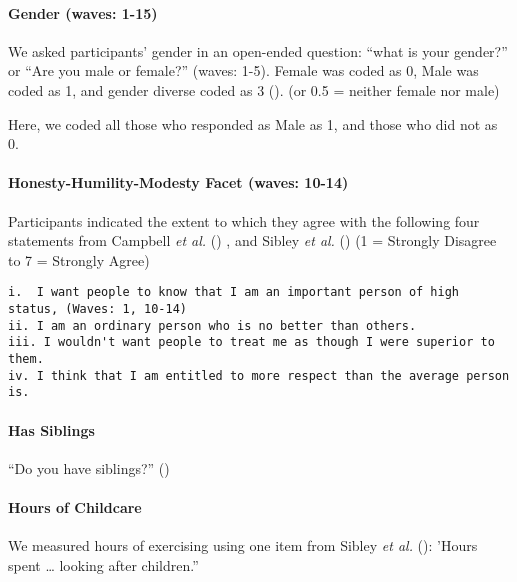 \documentclass[
  singlecolumn]{article}
\let\oldparagraph\paragraph
\renewcommand{\paragraph}[1]{\oldparagraph{#1}\mbox{}}
\begin{document}
\paragraph{Gender (waves: 1-15)}\label{gender-waves-1-15}

We asked participants' gender in an open-ended question: ``what is your
gender?'' or ``Are you male or female?'' (waves: 1-5). Female was coded
as 0, Male was coded as 1, and gender diverse coded as 3
(). (or 0.5
= neither female nor male)

Here, we coded all those who responded as Male as 1, and those who did
not as 0.

\paragraph{Honesty-Humility-Modesty Facet (waves:
10-14)}\label{honesty-humility-modesty-facet-waves-10-14}

Participants indicated the extent to which they agree with the following
four statements from Campbell \emph{et al.}
() , and Sibley \emph{et al.}
() (1 = Strongly Disagree to 7 = Strongly
Agree)

\begin{verbatim}
i.  I want people to know that I am an important person of high status, (Waves: 1, 10-14)
ii. I am an ordinary person who is no better than others.
iii. I wouldn't want people to treat me as though I were superior to them.
iv. I think that I am entitled to more respect than the average person is.
\end{verbatim}

\paragraph{Has Siblings}\label{has-siblings}

``Do you have siblings?'' ()

\paragraph{Hours of Childcare}\label{hours-of-childcare}

We measured hours of exercising using one item from Sibley \emph{et al.}
(): 'Hours spent \ldots{} looking after
children.''
\end{document}
